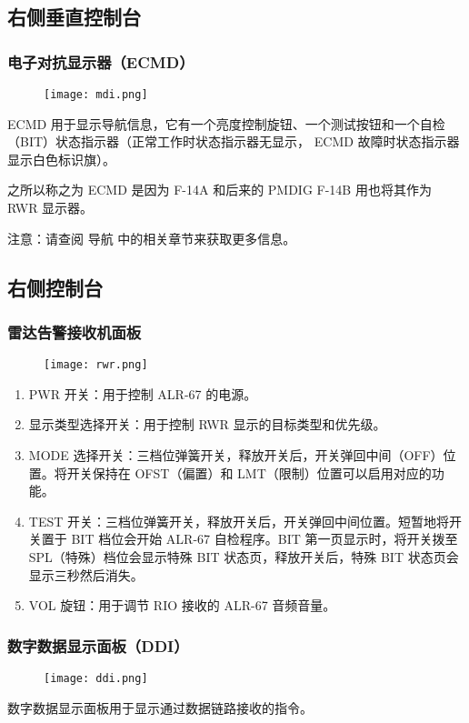 \subsection{右侧垂直控制台}

\subsubsection{电子对抗显示器（ECMD）}
\begin{figure}[htb]
  \center
  \texttt{[image: mdi.png]}
\end{figure}
ECMD 用于显示导航信息，它有一个亮度控制旋钮、一个测试按钮和一个自检（BIT）状态指示器（正常工作时状态指示器无显示， ECMD 故障时状态指示器显示白色标识旗）。

之所以称之为 ECMD 是因为 F-14A 和后来的 PMDIG F-14B 用也将其作为 RWR 显示器。

注意：请查阅 导航 中的相关章节来获取更多信息。

\subsection{右侧控制台}

\subsubsection{雷达告警接收机面板}
\begin{figure}[htb]
  \center
  \texttt{[image: rwr.png]}
\end{figure}

\begin{enumerate}
  \item PWR 开关：用于控制 ALR-67 的电源。
  \item 显示类型选择开关：用于控制 RWR 显示的目标类型和优先级。
  \item MODE 选择开关：三档位弹簧开关，释放开关后，开关弹回中间（OFF）位置。将开关保持在 OFST（偏置）和 LMT（限制）位置可以启用对应的功能。
  \item TEST 开关：三档位弹簧开关，释放开关后，开关弹回中间位置。短暂地将开关置于 BIT 档位会开始 ALR-67 自检程序。BIT 第一页显示时，将开关拨至 SPL（特殊）档位会显示特殊 BIT 状态页，释放开关后，特殊 BIT 状态页会显示三秒然后消失。
  \item VOL 旋钮：用于调节 RIO 接收的 ALR-67 音频音量。  
\end{enumerate}

\subsubsection{数字数据显示面板（DDI）}
\begin{figure}[htb]
  \center
  \texttt{[image: ddi.png]}
\end{figure}
数字数据显示面板用于显示通过数据链路接收的指令。

